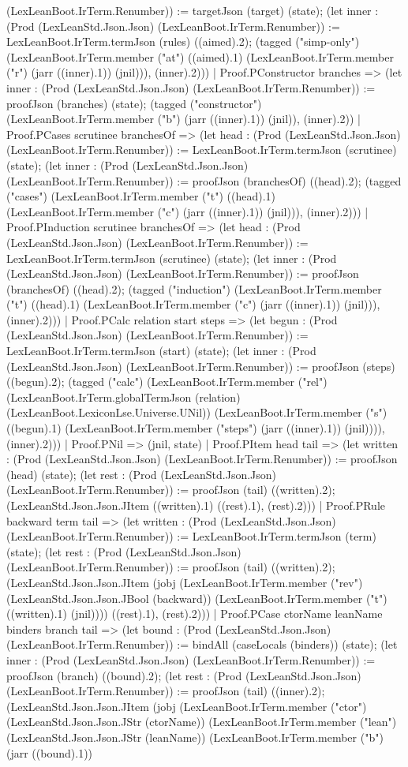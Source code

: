 \documentclass[11pt]{article}
\begin{document}
(LexLeanBoot.IrTerm.Renumber)) := targetJson (target) (state); (let inner : (Prod (LexLeanStd.Json.Json) (LexLeanBoot.IrTerm.Renumber)) := LexLeanBoot.IrTerm.termJson (rules) ((aimed).2); (tagged ("simp-only") (LexLeanBoot.IrTerm.member ("at") ((aimed).1) (LexLeanBoot.IrTerm.member ("r") (jarr ((inner).1)) (jnil))), (inner).2))) | Proof.PConstructor branches => (let inner : (Prod (LexLeanStd.Json.Json) (LexLeanBoot.IrTerm.Renumber)) := proofJson (branches) (state); (tagged ("constructor") (LexLeanBoot.IrTerm.member ("b") (jarr ((inner).1)) (jnil)), (inner).2)) | Proof.PCases scrutinee branchesOf => (let head : (Prod (LexLeanStd.Json.Json) (LexLeanBoot.IrTerm.Renumber)) := LexLeanBoot.IrTerm.termJson (scrutinee) (state); (let inner : (Prod (LexLeanStd.Json.Json) (LexLeanBoot.IrTerm.Renumber)) := proofJson (branchesOf) ((head).2); (tagged ("cases") (LexLeanBoot.IrTerm.member ("t") ((head).1) (LexLeanBoot.IrTerm.member ("c") (jarr ((inner).1)) (jnil))), (inner).2))) | Proof.PInduction scrutinee branchesOf => (let head : (Prod (LexLeanStd.Json.Json) (LexLeanBoot.IrTerm.Renumber)) := LexLeanBoot.IrTerm.termJson (scrutinee) (state); (let inner : (Prod (LexLeanStd.Json.Json) (LexLeanBoot.IrTerm.Renumber)) := proofJson (branchesOf) ((head).2); (tagged ("induction") (LexLeanBoot.IrTerm.member ("t") ((head).1) (LexLeanBoot.IrTerm.member ("c") (jarr ((inner).1)) (jnil))), (inner).2))) | Proof.PCalc relation start steps => (let begun : (Prod (LexLeanStd.Json.Json) (LexLeanBoot.IrTerm.Renumber)) := LexLeanBoot.IrTerm.termJson (start) (state); (let inner : (Prod (LexLeanStd.Json.Json) (LexLeanBoot.IrTerm.Renumber)) := proofJson (steps) ((begun).2); (tagged ("calc") (LexLeanBoot.IrTerm.member ("rel") (LexLeanBoot.IrTerm.globalTermJson (relation) (LexLeanBoot.LexiconLse.Universe.UNil)) (LexLeanBoot.IrTerm.member ("s") ((begun).1) (LexLeanBoot.IrTerm.member ("steps") (jarr ((inner).1)) (jnil)))), (inner).2))) | Proof.PNil => (jnil, state) | Proof.PItem head tail => (let written : (Prod (LexLeanStd.Json.Json) (LexLeanBoot.IrTerm.Renumber)) := proofJson (head) (state); (let rest : (Prod (LexLeanStd.Json.Json) (LexLeanBoot.IrTerm.Renumber)) := proofJson (tail) ((written).2); (LexLeanStd.Json.Json.JItem ((written).1) ((rest).1), (rest).2))) | Proof.PRule backward term tail => (let written : (Prod (LexLeanStd.Json.Json) (LexLeanBoot.IrTerm.Renumber)) := LexLeanBoot.IrTerm.termJson (term) (state); (let rest : (Prod (LexLeanStd.Json.Json) (LexLeanBoot.IrTerm.Renumber)) := proofJson (tail) ((written).2); (LexLeanStd.Json.Json.JItem (jobj (LexLeanBoot.IrTerm.member ("rev") (LexLeanStd.Json.Json.JBool (backward)) (LexLeanBoot.IrTerm.member ("t") ((written).1) (jnil)))) ((rest).1), (rest).2))) | Proof.PCase ctorName leanName binders branch tail => (let bound : (Prod (LexLeanStd.Json.Json) (LexLeanBoot.IrTerm.Renumber)) := bindAll (caseLocals (binders)) (state); (let inner : (Prod (LexLeanStd.Json.Json) (LexLeanBoot.IrTerm.Renumber)) := proofJson (branch) ((bound).2); (let rest : (Prod (LexLeanStd.Json.Json) (LexLeanBoot.IrTerm.Renumber)) := proofJson (tail) ((inner).2); (LexLeanStd.Json.Json.JItem (jobj (LexLeanBoot.IrTerm.member ("ctor") (LexLeanStd.Json.Json.JStr (ctorName)) (LexLeanBoot.IrTerm.member ("lean") (LexLeanStd.Json.Json.JStr (leanName)) (LexLeanBoot.IrTerm.member ("b") (jarr ((bound).1)) 
\end{document}
